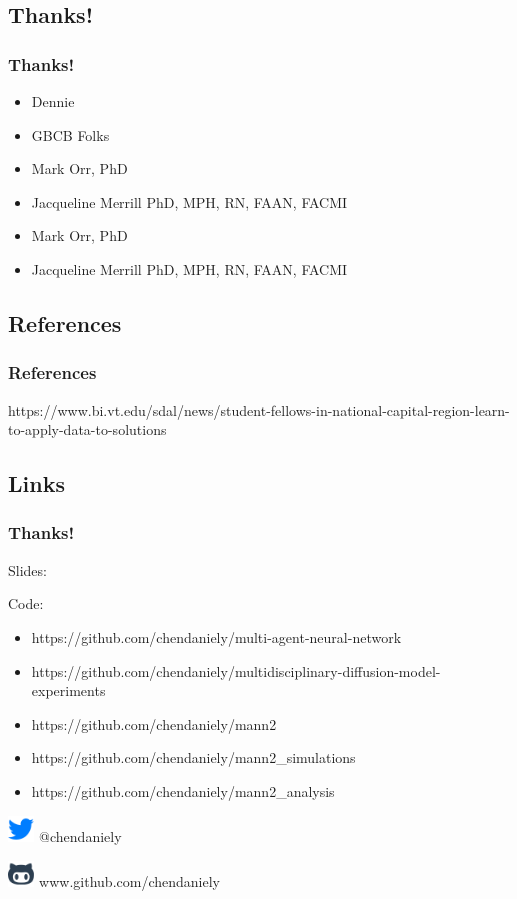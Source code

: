 \documentclass[compress]{beamer}
\begin{document}
\subsection{Thanks!}

	\begin{frame}[Basic2] \frametitle{Thanks!}
		\begin{itemize}
			\item Dennie
			\item GBCB Folks
		\end{itemize}
	
		\begin{itemize}
			\item Mark Orr, PhD
			\item Jacqueline Merrill PhD, MPH, RN, FAAN, FACMI
		\end{itemize}
	
		\begin{itemize}
			\item Mark Orr, PhD
			\item Jacqueline Merrill PhD, MPH, RN, FAAN, FACMI
		\end{itemize}
	\end{frame}
	
\subsection{References}
	\begin{frame}[Basic2] \frametitle{References}
		\tiny
		https://www.bi.vt.edu/sdal/news/student-fellows-in-national-capital-region-learn-to-apply-data-to-solutions
	\end{frame}

\subsection{Links}
	\begin{frame}[Basic2] \frametitle{Thanks!}
		\tiny

		Slides:
		
		Code:
		\begin{itemize}
			\item https://github.com/chendaniely/multi-agent-neural-network
			\item https://github.com/chendaniely/multidisciplinary-diffusion-model-experiments
			\item https://github.com/chendaniely/mann2
			\item https://github.com/chendaniely/mann2\_simulations
			\item https://github.com/chendaniely/mann2\_analysis
		\end{itemize}

		\includegraphics[width=7mm]{../figures/font-awesome_4-6-3_twitter_256_0_007dff_none}
		@chendaniely

		\includegraphics[width=7mm]{../figures/brandico_2014-04-07_github_256_0_2c3e50_none}
		www.github.com/chendaniely
	\end{frame}
\end{document}

